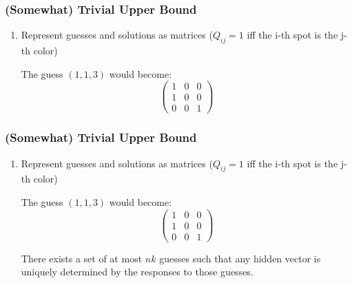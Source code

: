 \documentclass{beamer}
\begin{document}
    \begin{frame}
    \frametitle{(Somewhat) Trivial Upper Bound}
    \begin{enumerate}[label=\arabic*.]
	\item Represent guesses and solutions as matrices ($Q_{ij} = 1$ iff the i-th spot is the j-th color) \\
	\begin{tcolorbox}[colback=blue!5,colframe=blue!40!black,title=Example]
	The guess $(1,1,3)$ would become:
	\[ \left( \begin{array}{ccc}
	1 & 0 & 0 \\
	1 & 0 & 0 \\
	0 & 0 & 1 \end{array} \right)\]
	\end{tcolorbox}
	 \vspace{10px}
    \end{enumerate}
    \end{frame}

    \begin{frame}
    \frametitle{(Somewhat) Trivial Upper Bound}
	 \begin{enumerate}[label=\arabic*.]
	\item Represent guesses and solutions as matrices ($Q_{ij} = 1$ iff the i-th spot is the j-th color) \\
	\begin{tcolorbox}[colback=blue!5,colframe=blue!40!black,title=Example]
	The guess $(1,1,3)$ would become:
	\[ \left( \begin{array}{ccc}
	1 & 0 & 0 \\
	1 & 0 & 0 \\
	0 & 0 & 1 \end{array} \right)\]
	\end{tcolorbox}
	\begin{tcolorbox}[colback=blue!5,colframe=blue!40!black,title=Theorem]
	There exists a set of at most $nk$ guesses such that any hidden vector is uniquely determined by the responses
	to those guesses.
	\end{tcolorbox} 
	\end{enumerate}
    \end{frame}
\end{document}
